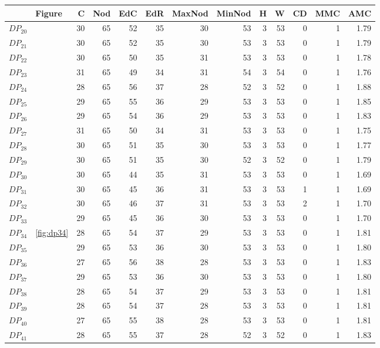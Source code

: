 \documentclass{article}
\begin{document}
\begin{center}
\begin{tabular}{llrrrrrrrrrrr}
\toprule
 & Figure & C & Nod & EdC & EdR & MaxNod & MinNod & H & W & CD & MMC & AMC \\
\midrule
$DP_{20}$ &  & 30 & 65 & 52 & 35 & 30 & 53 & 3 & 53 & 0 & 1 & 1.79 \\
$DP_{21}$ &  & 30 & 65 & 52 & 35 & 30 & 53 & 3 & 53 & 0 & 1 & 1.79 \\
$DP_{22}$ &  & 30 & 65 & 50 & 35 & 31 & 53 & 3 & 53 & 0 & 1 & 1.78 \\
$DP_{23}$ &  & 31 & 65 & 49 & 34 & 31 & 54 & 3 & 54 & 0 & 1 & 1.76 \\
$DP_{24}$ &  & 28 & 65 & 56 & 37 & 28 & 52 & 3 & 52 & 0 & 1 & 1.88 \\
$DP_{25}$ &  & 29 & 65 & 55 & 36 & 29 & 53 & 3 & 53 & 0 & 1 & 1.85 \\
$DP_{26}$ &  & 29 & 65 & 54 & 36 & 29 & 53 & 3 & 53 & 0 & 1 & 1.83 \\
$DP_{27}$ &  & 31 & 65 & 50 & 34 & 31 & 53 & 3 & 53 & 0 & 1 & 1.75 \\
$DP_{28}$ &  & 30 & 65 & 51 & 35 & 30 & 53 & 3 & 53 & 0 & 1 & 1.77 \\
$DP_{29}$ &  & 30 & 65 & 51 & 35 & 30 & 52 & 3 & 52 & 0 & 1 & 1.79 \\
$DP_{30}$ &  & 30 & 65 & 44 & 35 & 31 & 53 & 3 & 53 & 0 & 1 & 1.69 \\
$DP_{31}$ &  & 30 & 65 & 45 & 36 & 31 & 53 & 3 & 53 & 1 & 1 & 1.69 \\
$DP_{32}$ &  & 30 & 65 & 46 & 37 & 31 & 53 & 3 & 53 & 2 & 1 & 1.70 \\
$DP_{33}$ &  & 29 & 65 & 45 & 36 & 30 & 53 & 3 & 53 & 0 & 1 & 1.70 \\
$DP_{34}$ & \ref{fig:dp34} & 28 & 65 & 54 & 37 & 29 & 53 & 3 & 53 & 0 & 1 & 1.81 \\
$DP_{35}$ &  & 29 & 65 & 53 & 36 & 30 & 53 & 3 & 53 & 0 & 1 & 1.80 \\
$DP_{36}$ &  & 27 & 65 & 56 & 38 & 28 & 53 & 3 & 53 & 0 & 1 & 1.83 \\
$DP_{37}$ &  & 29 & 65 & 53 & 36 & 30 & 53 & 3 & 53 & 0 & 1 & 1.80 \\
$DP_{38}$ &  & 28 & 65 & 54 & 37 & 29 & 53 & 3 & 53 & 0 & 1 & 1.81 \\
$DP_{39}$ &  & 28 & 65 & 54 & 37 & 28 & 53 & 3 & 53 & 0 & 1 & 1.81 \\
$DP_{40}$ &  & 27 & 65 & 55 & 38 & 28 & 53 & 3 & 53 & 0 & 1 & 1.81 \\
$DP_{41}$ &  & 28 & 65 & 55 & 37 & 28 & 52 & 3 & 52 & 0 & 1 & 1.83 \\

\end{tabular}
\end{center}
\end{document}
